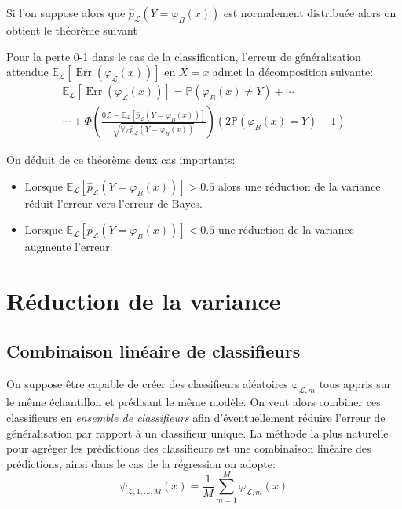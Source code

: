 Si l'on suppose alors que $\hat{p}_{\mathcal{L}} (Y = \varphi_B (x))$ est normalement distribuée alors on obtient le théorème suivant
\begin{theoreme}
Pour la perte 0-1 dans le cas de la classification, l'erreur de généralisation attendue $\mathbb{E}_{\mathcal{L}} \left[ \operatorname{Err} ( \varphi_{\mathcal{L}} (x) ) \right]$ en $ X = x $ admet la décomposition suivante:
\begin{gather*}
    \mathbb{E}_{\mathcal{L}} \left[ \operatorname{Err} ( \varphi_{\mathcal{L}} (x) ) \right] = \mathbb{P} ( \varphi_B (x) \neq Y ) + \dotsb \\
    \dotsb + \Phi \left( \frac{0.5 - \mathbb{E}_{\mathcal{L}} [ \hat{p}_{\mathcal{L}} (Y = \varphi_B (x)) ] }{\sqrt{\mathbb{V}_{\mathcal{L}} \hat{p}_{\mathcal{L}} (Y = \varphi_B (x)) } } \right) \left( 2 \mathbb{P} ( \varphi_B (x) = Y ) - 1 \right)
\end{gather*}
\end{theoreme}

On déduit de ce théorème deux cas importants:
\begin{itemize}
    \item Lorsque $\mathbb{E}_{\mathcal{L}} \left[ \hat{p}_{\mathcal{L}} (Y = \varphi_B (x)) \right] > 0.5$ alors une réduction de la variance réduit l'erreur vers l'erreur de Bayes.
    \item Lorsque $\mathbb{E}_{\mathcal{L}} \left[ \hat{p}_{\mathcal{L}} (Y = \varphi_B (x)) \right] < 0.5$ une réduction de la variance augmente l'erreur.
\end{itemize}

\section{Réduction de la variance}
\subsection{Combinaison linéaire de classifieurs}\label{subsec:combinaison_lineaire}

On suppose être capable de créer des classifieurs aléatoires $\varphi_{\mathcal{L},m}$ tous appris sur le même échantillon et prédisant le même modèle. On veut alors combiner ces classifieurs en \emph{ensemble de classifieurs} afin d'éventuellement réduire l'erreur de généralisation par rapport à un classifieur unique.
La méthode la plus naturelle pour agréger les prédictions des classifieurs est une combinaison linéaire des prédictions, ainsi dans le cas de la régression on adopte:
\begin{equation*}
    \psi_{\mathcal{L},1,\dotsc,M} (x) = \frac{1}{M} \sum_{m=1}^M \varphi_{\mathcal{L},m} (x)
\end{equation*}

